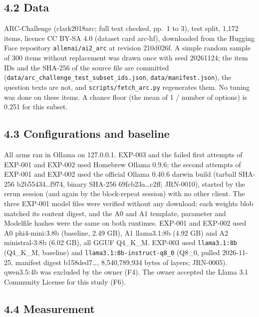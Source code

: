 \documentclass[
]{article}
\begin{document}
\subsection{4.2 Data}\label{data}

ARC-Challenge (clark2018arc; full text checked, pp.~1 to 3), test split,
1,172 items, licence CC BY-SA 4.0 (dataset card arc-hf), downloaded from
the Hugging Face repository \texttt{allenai/ai2\_arc} at revision
210d026f. A simple random sample of 300 items without replacement was
drawn once with seed 20261124; the item IDs and the SHA-256 of the
source file are committed
(\texttt{data/arc\_challenge\_test\_subset\_ids.json},
\texttt{data/manifest.json}), the question texts are not, and
\texttt{scripts/fetch\_arc.py} regenerates them. No tuning was done on
these items. A chance floor (the mean of 1 / number of options) is 0.251
for this subset.

\subsection{4.3 Configurations and
baseline}\label{configurations-and-baseline}

All arms ran in Ollama on 127.0.0.1. EXP-003 and the failed first
attempts of EXP-001 and EXP-002 used Homebrew Ollama 0.9.6; the second
attempts of EXP-001 and EXP-002 used the official Ollama 0.40.6 darwin
build (tarball SHA-256 b2b55434\ldots f974, binary SHA-256
69fcb23a\ldots c2ff; JRN-0010), started by the rerun session (and again
by the block-repeat session) with no other client. The three EXP-001
model files were verified without any download: each weights blob
matched its content digest, and the A0 and A1 template, parameter and
Modelfile hashes were the same on both runtimes. EXP-001 and EXP-002
used A0 phi4-mini:3.8b (baseline, 2.49 GB), A1 llama3.1:8b (4.92 GB) and
A2 ministral-3:8b (6.02 GB), all GGUF Q4\_K\_M. EXP-003 used
\texttt{llama3.1:8b} (Q4\_K\_M, baseline) and
\texttt{llama3.1:8b-instruct-q8\_0} (Q8\_0, pulled 2026-11-25, manifest
digest b158ded7\ldots, 8,540,789,934 bytes of layers; JRN-0005).
qwen3.5:4b was excluded by the owner (F4). The owner accepted the Llama
3.1 Community License for this study (F6).

\subsection{4.4 Measurement}\label{measurement}
\end{document}
